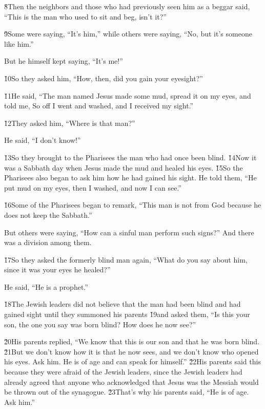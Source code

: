 \v{8}Then the neighbors and those who had previously seen him as a beggar said, ``This is the man who used to sit and beg, isn't it?''

\v{9}Some were saying, ``It's him,'' while others were saying, ``No, but it's someone like him.''

But he himself kept saying, ``It's me!''

\v{10}So they asked him, ``How, then, did you gain your eyesight?''

\v{11}He said, ``The man named Jesus made some mud, spread it on my eyes, and told me,  So off I went and washed, and I received my sight.''

\v{12}They asked him, ``Where is that man?''

He said, ``I don't know!''

\v{13}So they brought to the Pharisees the man who had once been blind. \v{14}Now it was a Sabbath day when Jesus made the mud and healed his eyes. \v{15}So the Pharisees also began to ask him how he had gained his sight. He told them, ``He put mud on my eyes, then I washed, and now I can see.''

\v{16}Some of the Pharisees began to remark, ``This man is not from God because he does not keep the Sabbath.''

But others were saying, ``How can a sinful man perform such signs?'' And there was a division among them.

\v{17}So they asked the formerly blind man again, ``What do you say about him, since it was your eyes he healed?''

He said, ``He is a prophet.''

\v{18}The Jewish leaders did not believe that the man had been blind and had gained sight until they summoned his parents \v{19}and asked them, ``Is this your son, the one you say was born blind? How does he now see?''

\v{20}His parents replied, ``We know that this is our son and that he was born blind. \v{21}But we don't know how it is that he now sees, and we don't know who opened his eyes. Ask him. He is of age and can speak for himself.'' \v{22}His parents said this because they were afraid of the Jewish leaders, since the Jewish leaders had already agreed that anyone who acknowledged that Jesus was the Messiah would be thrown out of the synagogue. \v{23}That's why his parents said, ``He is of age. Ask him.''

